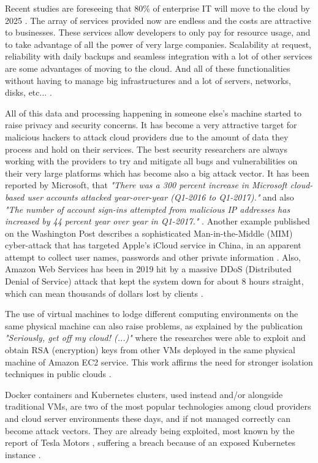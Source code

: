 Recent studies are foreseeing that 80{\%} of enterprise IT will move to the cloud by 2025 \cite{cloud_statistic:1}. The array of services provided now are endless and the costs are attractive to businesses. These services allow developers to only pay for resource usage, and to take advantage of all the power of very large companies. Scalability at request, reliability with daily backups and seamless integration with a lot of other services are some advantages of moving to the cloud. And all of these functionalities without having to manage big infrastructures and a lot of servers, networks, disks, etc... \cite{cloud_benefits:1}.

All of this data and processing happening in someone else's machine started to raise privacy and security concerns. It has become a very attractive target for malicious hackers to attack cloud providers due to the amount of data they process and hold on their services. The best security researchers are always working with the providers to try and mitigate all bugs and vulnerabilities on their very large platforms which has become also a big attack vector. It has been reported by Microsoft, that \textit{"There was a 300 percent increase in Microsoft cloud-based user accounts attacked year-over-year (Q1-2016 to Q1-2017)."} and also \textit{"The number of account sign-ins attempted from malicious IP addresses has increased by 44 percent year over year in Q1-2017."} \cite{cloud_attacks:1}. Another example published on the Washington Post describes a sophisticated Man-in-the-Middle (\gls{MIM}) cyber-attack that has targeted Apple’s iCloud service in China, in an apparent attempt to collect user names, passwords and other private information \cite{cloud_attacks:2}. Also, Amazon Web Services has been in 2019 hit by a massive \gls{DDoS} (Distributed Denial of Service) attack that kept the system down for about 8 hours straight, which can mean thousands of dollars lost by clients \cite{cloud_attacks:3}.

The use of virtual machines to lodge different computing environments on the same physical machine can also raise problems, as explained by the publication \textit{"Seriously, get off my cloud! (...)"} where the researches were able to exploit and obtain \gls{RSA} (encryption) keys from other \glspl{VM} deployed in the same physical machine of Amazon EC2 service. This work affirms the need for stronger isolation techniques in public clouds \cite{cryptoeprint:2015:898}.

Docker containers and Kubernetes clusters, used instead and/or alongside traditional \glspl{VM}, are two of the most popular technologies among cloud providers and cloud server environments these days, and if not managed correctly can become attack vectors. They are already being exploited, most known by the report of Tesla Motors \cite{tesla_leak:1}, suffering a breach because of an exposed Kubernetes instance \cite{docker_leak:1, kubernetes_leak:1}.

